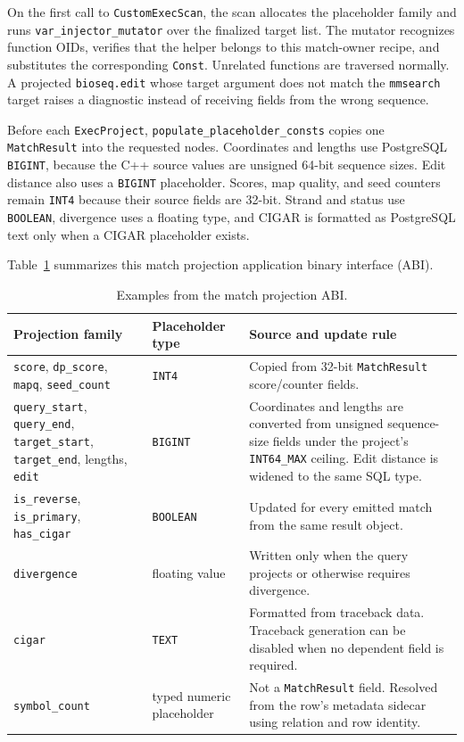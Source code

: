 On the first call to \texttt{CustomExecScan}, the scan allocates the
placeholder family and runs \texttt{var\_injector\_mutator} over the finalized
target list.  The mutator recognizes function OIDs, verifies that the helper
belongs to this match-owner recipe, and substitutes the corresponding
\texttt{Const}.  Unrelated functions are traversed normally.  A projected
\texttt{bioseq.edit} whose target argument does not match the
\texttt{mmsearch} target raises a diagnostic instead of receiving fields from
the wrong sequence.

Before each \texttt{ExecProject},
\texttt{populate\_placeholder\_consts} copies one
\texttt{MatchResult} into the requested nodes.  Coordinates and lengths use
PostgreSQL \texttt{BIGINT}, because the C++ source values are unsigned
64-bit sequence sizes.  Edit distance also uses a \texttt{BIGINT}
placeholder.  Scores, map quality, and seed counters remain \texttt{INT4}
because their source fields are 32-bit.  Strand and status use
\texttt{BOOLEAN}, divergence uses a floating type, and CIGAR is formatted as
PostgreSQL text only when a CIGAR placeholder exists.

Table~\ref{tab:match-placeholder-types} summarizes this match projection
application binary interface (ABI).

\begin{table}[htbp]
\centering
\small
\caption{Examples from the match projection ABI.}
\label{tab:match-placeholder-types}
\begin{tabular}{@{}p{}p{}p{}@{}}
\toprule
Projection family & Placeholder type & Source and update rule \\
\midrule
\texttt{score}, \texttt{dp\_score}, \texttt{mapq},
\texttt{seed\_count} &
\texttt{INT4} &
Copied from 32-bit \texttt{MatchResult} score/counter fields. \\
\texttt{query\_start}, \texttt{query\_end},
\texttt{target\_start}, \texttt{target\_end}, lengths,
\texttt{edit} &
\texttt{BIGINT} &
Coordinates and lengths are converted from unsigned sequence-size fields
under the project's \texttt{INT64\_MAX} ceiling.  Edit distance is widened to
the same SQL type. \\
\texttt{is\_reverse}, \texttt{is\_primary},
\texttt{has\_cigar} &
\texttt{BOOLEAN} &
Updated for every emitted match from the same result object. \\
\texttt{divergence} &
floating value &
Written only when the query projects or otherwise requires divergence. \\
\texttt{cigar} &
\texttt{TEXT} &
Formatted from traceback data.  Traceback generation can be disabled when no
dependent field is required. \\
\texttt{symbol\_count} &
typed numeric placeholder &
Not a \texttt{MatchResult} field.  Resolved from the row's metadata sidecar
using relation and row identity. \\
\bottomrule
\end{tabular}
\end{table}

